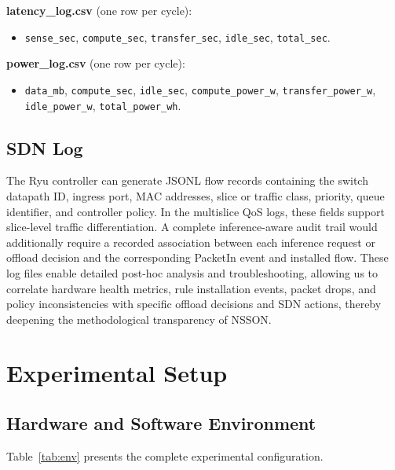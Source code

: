 \documentclass[journal]{IEEEtran}
\begin{document}
\textbf{latency\_log.csv} (one row per cycle):
\begin{itemize}
\item \texttt{sense\_sec}, \texttt{compute\_sec}, \texttt{transfer\_sec},
  \texttt{idle\_sec}, \texttt{total\_sec}.
\end{itemize}

\textbf{power\_log.csv} (one row per cycle):
\begin{itemize}
\item \texttt{data\_mb}, \texttt{compute\_sec}, \texttt{idle\_sec},
  \texttt{compute\_power\_w}, \texttt{transfer\_power\_w},
  \texttt{idle\_power\_w}, \texttt{total\_power\_wh}.
\end{itemize}

\subsection{SDN Log}
The Ryu controller can generate JSONL flow records containing the switch datapath ID, ingress port, MAC addresses, slice or traffic class, priority, queue identifier, and controller policy. In the multislice QoS logs, these fields support slice-level traffic differentiation. A complete inference-aware audit trail would additionally require a recorded association between each inference request or offload decision and the corresponding PacketIn event and installed flow.
These log files enable detailed post-hoc analysis and troubleshooting, allowing us to correlate hardware health metrics, rule installation events, packet drops, and policy inconsistencies with specific offload decisions and SDN actions, thereby deepening the methodological transparency of NSSON.

\section{Experimental Setup}
\label{sec:setup}

\subsection{Hardware and Software Environment}

Table~\ref{tab:env} presents the complete experimental configuration.
\end{document}
